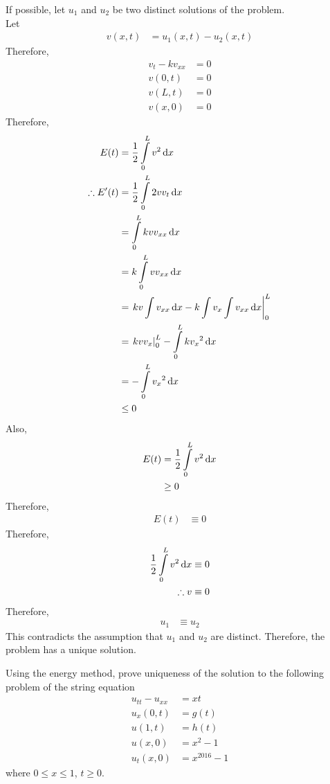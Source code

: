 \documentclass[fleqn, a4paper, 11pt, oneside]{amsart}
\theoremstyle{definition}
\theoremstyle{theorem}
\begin{document}
\begin{solution}
	If possible, let $u_1$ and $u_2$ be two distinct solutions of the problem.\\
	Let
	\begin{align*}
		v(x,t) &= u_1(x,t) - u_2(x,t)
	\end{align*}
	Therefore,
	\begin{align*}
		v_t - k v_{x x} &= 0\\
		v(0,t) &= 0\\
		v(L,t) &= 0\\
		v(x,0) &= 0
	\end{align*}
	Therefore,
	\begin{align*}
		E(t) &= \frac{1}{2} \int\limits_{0}^{L} v^2 \dif x\\
		\therefore E'(t) &= \frac{1}{2} \int\limits_{0}^{L} 2 v v_t \dif x\\
		&= \int\limits_{0}^{L} k v v_{x x} \dif x\\
		&= k \int\limits_{0}^{L} v v_{x x} \dif x\\
		&= \left. k v \int v_{x x} \dif x - k \int v_x \int v_{x x} \dif x \right|_{0}^{L}\\
		&= \left. k v v_x \right|_{0}^{L} - \int\limits_{0}^{L} k {v_x}^2 \dif x\\
		&= -\int\limits_{0}^{L} {v_x}^2 \dif x\\
		&\le 0
	\end{align*}
	Also,
	\begin{align*}
		E(t) &= \frac{1}{2} \int\limits_{0}^{L} v^2 \dif x\\
		&\ge 0
	\end{align*}
	Therefore,
	\begin{align*}
		E(t) &\equiv 0
	\end{align*}
	Therefore,
	\begin{align*}
		\frac{1}{2} \int\limits_{0}^{L} v^2 \dif x &\equiv 0\\
		\therefore v &\equiv 0
	\end{align*}
	Therefore,
	\begin{align*}
		u_1 &\equiv u_2
	\end{align*}
	This contradicts the assumption that $u_1$ and $u_2$ are distinct.
	Therefore, the problem has a unique solution.
\end{solution}

\begin{question}
	Using the energy method, prove uniqueness of the solution to the following problem of the string equation
	\begin{align*}
		u_{t t} - u_{x x} &= x t\\
		u_x(0,t) &= g(t)\\
		u(1,t) &= h(t)\\
		u(x,0) &= x^2 - 1\\
		u_t(x,0) &= x^{2016} - 1
	\end{align*}
	where $0 \le x \le 1$, $t \ge 0$.
\end{question}
\end{document}
